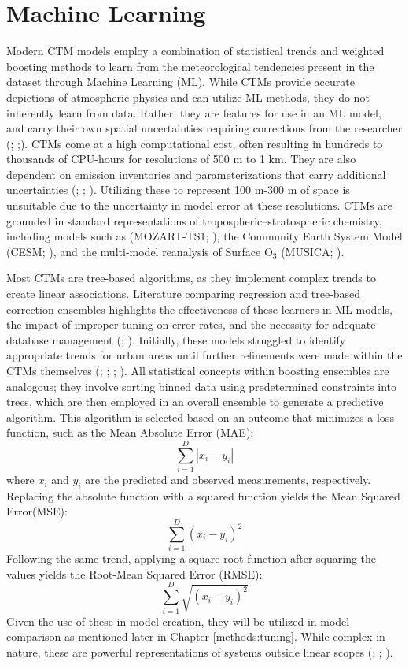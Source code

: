 \section{Machine Learning} \label{litreview:ml} Modern CTM models employ a combination of statistical trends and weighted boosting methods to learn from the meteorological tendencies present in the dataset through Machine Learning (ML). While CTMs provide accurate depictions of atmospheric physics and can utilize ML methods, they do not inherently learn from data. Rather, they are features for use in an ML model, and carry their own spatial uncertainties requiring corrections from the researcher (\cite{yu_errors_2018}; \cite{travis_systematic_2019};\cite{xiong_improved_2024}). CTMs come at a high computational cost, often resulting in hundreds to thousands of CPU-hours for resolutions of 500 m to 1 km. They are also dependent on emission inventories and parameterizations that carry additional uncertainties (\cite{chen_comparison_2021}; \cite{gilliland_dynamic_2008}; \cite{han_modeling_2018}). Utilizing these to represent 100 m-300 m of space is unsuitable due to the uncertainty in model error at these resolutions. CTMs are grounded in standard representations of tropospheric–stratospheric chemistry, including models such as (MOZART-TS1; \cite{meiyun_lin_us_2016}), the Community Earth System Model (CESM; \cite{kan_yi_response_2016}), and the multi-model reanalysis of Surface O$_3$ (MUSICA; \cite{lin_intercomparison_2024}).

Most CTMs are tree-based algorithms, as they implement complex trends to create linear associations. Literature comparing regression and tree-based correction ensembles highlights the effectiveness of these learners in ML models, the impact of improper tuning on error rates, and the necessity for adequate database management (\cite{wen_comparative_2021}; \cite{xiong_improved_2024}). Initially, these models struggled to identify appropriate trends for urban areas until further refinements were made within the CTMs themselves (\cite{staehle_technical_2023}; \cite{saeipourdizaj_correction_2022}; \cite{monteiro_bias_2013}; \cite{djalalova_ensemble_2010}). All statistical concepts within boosting ensembles are analogous; they involve sorting binned data using predetermined constraints into trees, which are then employed in an overall ensemble to generate a predictive algorithm. This algorithm is selected based on an outcome that minimizes a loss function, such as the Mean Absolute Error (MAE):
\[\sum_{i=1}^{D}|x_i-y_i|\]
where $x_i$ and $y_i$ are the predicted and observed measurements, respectively. Replacing the absolute function with a squared function yields the Mean Squared Error(MSE):
\[\sum_{i=1}^{D}(x_i-y_i)^2\]
Following the same trend, applying a square root function after squaring the values yields the Root-Mean Squared Error (RMSE): 
\[\sum_{i=1}^{D}\sqrt{(x_i-y_i)^2}\]
Given the use of these in model creation, they will be utilized in model comparison as mentioned later in Chapter \ref{methods:tuning}. While complex in nature, these are powerful representations of systems outside linear scopes (\cite{cao_using_2024}; \cite{rafael_can_2019}; \cite{wang_machine_2022}). 

